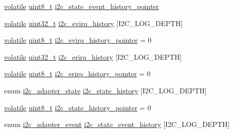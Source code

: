 \begin{DoxyCompactItemize}
\item 
\hyperlink{group___c_m_s_i_s___core___instruction_interface_gad7d93af13046b0378601b85c8c16673b}{volatile} \hyperlink{stdint_8h_aba7bc1797add20fe3efdf37ced1182c5}{uint8\-\_\-t} \hyperlink{group___p_i_o_s___i2_c_gabdb9d9357371d1ece20779da0d69d27b}{i2c\-\_\-state\-\_\-event\-\_\-history\-\_\-pointer}
\item 
\hyperlink{group___c_m_s_i_s___core___instruction_interface_gad7d93af13046b0378601b85c8c16673b}{volatile} \hyperlink{stdint_8h_a435d1572bf3f880d55459d9805097f62}{uint32\-\_\-t} \hyperlink{group___p_i_o_s___i2_c_ga958ee525a13dda424039275af66ad3ce}{i2c\-\_\-evirq\-\_\-history} \mbox{[}I2\-C\-\_\-\-L\-O\-G\-\_\-\-D\-E\-P\-T\-H\mbox{]}
\item 
\hyperlink{group___c_m_s_i_s___core___instruction_interface_gad7d93af13046b0378601b85c8c16673b}{volatile} \hyperlink{stdint_8h_aba7bc1797add20fe3efdf37ced1182c5}{uint8\-\_\-t} \hyperlink{group___p_i_o_s___i2_c_gadf5676851d3bae320be666713dd5cb95}{i2c\-\_\-evirq\-\_\-history\-\_\-pointer} = 0
\item 
\hyperlink{group___c_m_s_i_s___core___instruction_interface_gad7d93af13046b0378601b85c8c16673b}{volatile} \hyperlink{stdint_8h_a435d1572bf3f880d55459d9805097f62}{uint32\-\_\-t} \hyperlink{group___p_i_o_s___i2_c_ga682906503c30ce6f539ac8f7628346f8}{i2c\-\_\-erirq\-\_\-history} \mbox{[}I2\-C\-\_\-\-L\-O\-G\-\_\-\-D\-E\-P\-T\-H\mbox{]}
\item 
\hyperlink{group___c_m_s_i_s___core___instruction_interface_gad7d93af13046b0378601b85c8c16673b}{volatile} \hyperlink{stdint_8h_aba7bc1797add20fe3efdf37ced1182c5}{uint8\-\_\-t} \hyperlink{group___p_i_o_s___i2_c_ga0593115613cf2d368fe6dbe7b4e5dcff}{i2c\-\_\-erirq\-\_\-history\-\_\-pointer} = 0
\item 
enum \hyperlink{pios__i2c__priv_8h_ac73b69ffe53544057fa2e4751fd9c22b}{i2c\-\_\-adapter\-\_\-state} \hyperlink{group___p_i_o_s___i2_c_ga207839e0ce4c1011c30ea9254657251c}{i2c\-\_\-state\-\_\-history} \mbox{[}I2\-C\-\_\-\-L\-O\-G\-\_\-\-D\-E\-P\-T\-H\mbox{]}
\item 
\hyperlink{group___c_m_s_i_s___core___instruction_interface_gad7d93af13046b0378601b85c8c16673b}{volatile} \hyperlink{stdint_8h_aba7bc1797add20fe3efdf37ced1182c5}{uint8\-\_\-t} \hyperlink{group___p_i_o_s___i2_c_gad02d69a4953e925d905e000697a0d885}{i2c\-\_\-state\-\_\-history\-\_\-pointer} = 0
\item 
enum \hyperlink{group___p_i_o_s___i2_c_ga2a8f77797f5dbd873514e92d3d043649}{i2c\-\_\-adapter\-\_\-event} \hyperlink{group___p_i_o_s___i2_c_gad2fddef6926d27512901cbe84b7b99bd}{i2c\-\_\-state\-\_\-event\-\_\-history} \mbox{[}I2\-C\-\_\-\-L\-O\-G\-\_\-\-D\-E\-P\-T\-H\mbox{]}

\end{DoxyCompactItemize}
